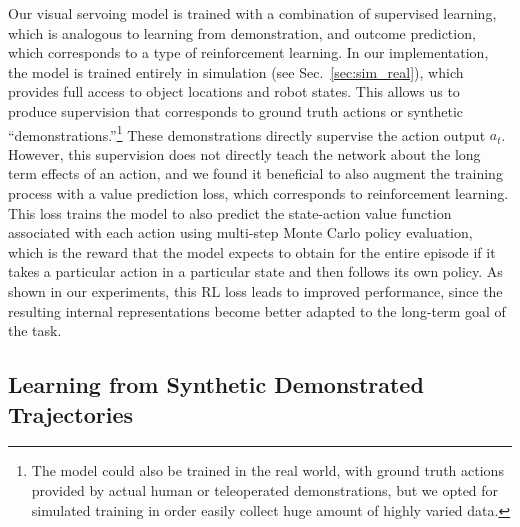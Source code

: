 \documentclass[10pt,twocolumn,letterpaper]{article}
\begin{document}
Our visual servoing model is trained with a combination of supervised learning, which is analogous to learning from demonstration, and outcome prediction, which corresponds to a type of reinforcement learning. In our implementation, the model is trained entirely in simulation (see Sec.~\ref{sec:sim_real}), which provides full access to object locations and robot states. This allows us to produce supervision that corresponds to ground truth actions or synthetic ``demonstrations.''\footnote{The model could also be trained in the real world, with ground truth actions provided by actual human or teleoperated demonstrations, but we opted for simulated training in order easily collect huge amount of highly varied data.} These demonstrations directly supervise the action output $a_t$. However, this supervision does not directly teach the network about the long term effects of an action, and we found it beneficial to also augment the training process with a value prediction loss, which corresponds to reinforcement learning. This loss trains the model to also predict the state-action value function associated with each action using multi-step Monte Carlo policy evaluation, which is the reward that the model expects to obtain for the entire episode if it takes a particular action in a particular state and then follows its own policy. As shown in our experiments, this RL loss leads to improved performance, since the resulting internal representations become better adapted to the long-term goal of the task.

\subsection{Learning from Synthetic Demonstrated Trajectories}
\end{document}
